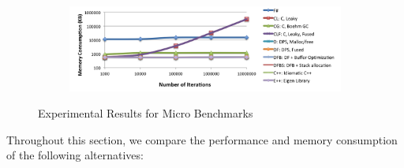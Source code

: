 \begin{figure}[t]
\begin{subfigure}[b]{.38\textwidth}
\label{fig:runtime_cross}
\end{subfigure}
\hfill
\begin{subfigure}[b]{.58\textwidth}
\includegraphics[width=\columnwidth]{results/micro_cross_mem.png}
\label{fig:mem_cross}
\end{subfigure}
\caption{Experimental Results for Micro Benchmarks}
\label{fig:exp_micro}
\end{figure}

Throughout this section, we compare the performance and memory consumption of the following alternatives:


